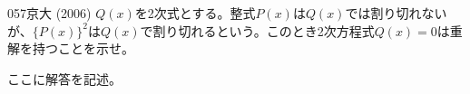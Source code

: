 \begin{thm}{057}{}{京大 (2006)}
 $Q(x)$を2次式とする。整式$P(x)$は$Q(x)$では割り切れないが、$\{P(x)\}^2$は$Q(x)$で割り切れるという。このとき2次方程式$Q(x)=0$は重解を持つことを示せ。
\end{thm}

ここに解答を記述。